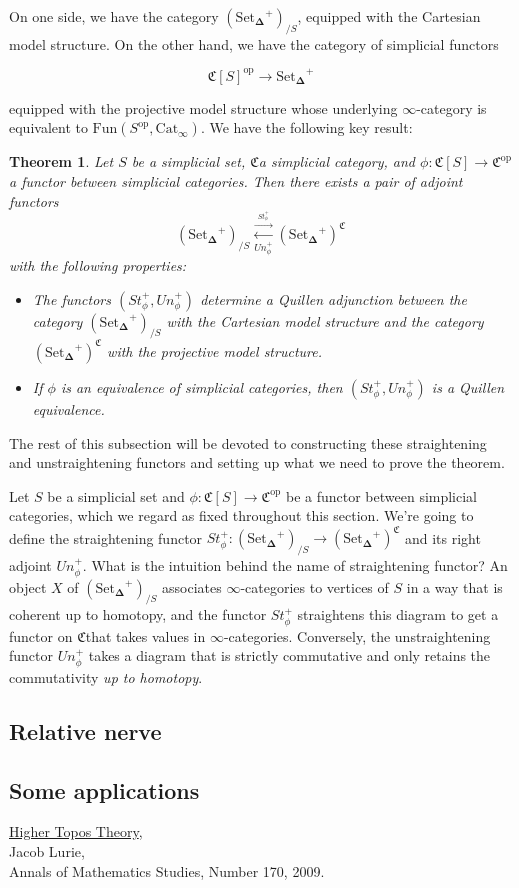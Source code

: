 \documentclass[12pt]{amsart}
\newcommand{\8}{\ensuremath{\infty}}
\newcommand{\C}{\ensuremath{\mathfrak{C}}}
\newcommand{\SSet}{\ensuremath{\text{Set}_{\boldsymbol{\Delta}}}}
\newcommand{\op}[1]{\ensuremath{{#1}^{\text{op}}}}
\newcommand{\adj}[2]{\ensuremath{\overset{\overset{#1}{ \rightarrow}}{\underset{#2}{\leftarrow}}}}
\newtheorem{theorem}{Theorem}
\begin{document}
On one side, we have the category $(\SSet^+)_{/S}$, equipped with the Cartesian model structure. On the other hand, we have the category of simplicial functors

$$
  \op{\mathfrak{C}[S]} \rightarrow \SSet^+
$$

equipped with the projective model structure whose underlying \8-category is equivalent to $\text{Fun}(\op{S}, \text{Cat}_\8). $ We have the following key result:

\begin{theorem}
  Let $S$ be a simplicial set, \C a simplicial category, and $\phi: \mathfrak{C}[S] \rightarrow \op\C$ a functor between simplicial categories. Then there exists a pair of adjoint functors
  \[(\SSet^+)_{/S} \adj{St_\phi^+}{Un_\phi^+} (\SSet^+)^\C\]
  with the following properties:
  \begin{itemize}
    \item[(1)] The functors $(St_\phi^+, Un_\phi^+)$ determine a Quillen adjunction between the category $(\SSet^+)_{/S}$ with the Cartesian model structure and the category $(\SSet^+)^\C$ with the projective model structure.
    \item[(2)] If $\phi$ is an equivalence of simplicial categories, then $(St_\phi^+, Un_\phi^+)$ is a Quillen equivalence.
  \end{itemize}
\end{theorem}

The rest of this subsection will be devoted to constructing these straightening and unstraightening functors and setting up what we need to prove the theorem.

Let $S$ be a simplicial set and $\phi: \mathfrak{C}[S] \rightarrow \op\C$ be a functor between simplicial categories, which we regard as fixed throughout this section. We're going to define the straightening functor $St_\phi^+: (\SSet^+)_{/S} \rightarrow (\SSet^+)^\C$ and its right adjoint $Un_\phi^+$. What is the intuition behind the name of straightening functor? An object $X$ of $(\SSet^+)_{/S}$ associates \8-categories to vertices of $S$ in a way that is coherent up to homotopy, and the functor $St_\phi^+$ straightens this diagram to get a functor on \C that takes values in \8-categories. Conversely, the unstraightening functor $Un_\phi^+$ takes a diagram that is strictly commutative and only retains the commutativity \emph{up to homotopy}.

\subsection{Relative nerve}
\subsection{Some applications}


\begin{thebibliography}{99}
  \href{https: //arxiv.org/abs/math/0608040}{Higher Topos Theory}, \\
  Jacob Lurie, \\
  Annals of Mathematics Studies, Number 170, 2009.
\end{thebibliography}
\end{document}
